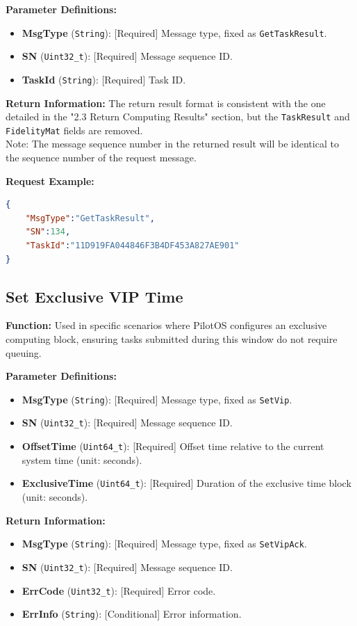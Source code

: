 \documentclass[12pt, a4paper]{article}
\begin{document}
\textbf{Parameter Definitions:}
\begin{itemize}
    \item \textbf{MsgType} (\texttt{String}): [Required] Message type, fixed as \texttt{GetTaskResult}.
    \item \textbf{SN} (\texttt{Uint32\_t}): [Required] Message sequence ID.
    \item \textbf{TaskId} (\texttt{String}): [Required] Task ID.
\end{itemize}

\textbf{Return Information:}
The return result format is consistent with the one detailed in the "2.3 Return Computing Results" section, but the \texttt{TaskResult} and \texttt{FidelityMat} fields are removed. \\
Note: The message sequence number in the returned result will be identical to the sequence number of the request message.

\noindent \textbf{Request Example:}
\begin{lstlisting}[language=json]
{
    "MsgType":"GetTaskResult",
    "SN":134,
    "TaskId":"11D919FA044846F3B4DF453A827AE901"
}
\end{lstlisting}

\subsection{Set Exclusive VIP Time}

\textbf{Function:} Used in specific scenarios where PilotOS configures an exclusive computing block, ensuring tasks submitted during this window do not require queuing.

\textbf{Parameter Definitions:}
\begin{itemize}
    \item \textbf{MsgType} (\texttt{String}): [Required] Message type, fixed as \texttt{SetVip}.
    \item \textbf{SN} (\texttt{Uint32\_t}): [Required] Message sequence ID.
    \item \textbf{OffsetTime} (\texttt{Uint64\_t}): [Required] Offset time relative to the current system time (unit: seconds).
    \item \textbf{ExclusiveTime} (\texttt{Uint64\_t}): [Required] Duration of the exclusive time block (unit: seconds).
\end{itemize}

\textbf{Return Information:}
\begin{itemize}
    \item \textbf{MsgType} (\texttt{String}): [Required] Message type, fixed as \texttt{SetVipAck}.
    \item \textbf{SN} (\texttt{Uint32\_t}): [Required] Message sequence ID.
    \item \textbf{ErrCode} (\texttt{Uint32\_t}): [Required] Error code.
    \item \textbf{ErrInfo} (\texttt{String}): [Conditional] Error information.
\end{itemize}
\end{document}
